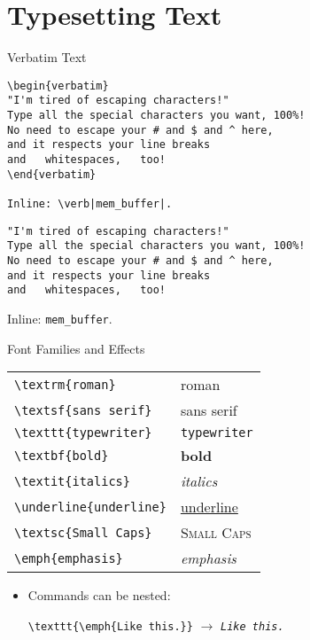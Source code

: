 \section{Typesetting Text}

\begin{frame}[fragile]{Verbatim Text}
\begin{lstlisting}[basicstyle=\ttfamily\footnotesize]
\begin{verbatim}
"I'm tired of escaping characters!"
Type all the special characters you want, 100%!
No need to escape your # and $ and ^ here,
and it respects your line breaks
and   whitespaces,   too!
\end{verbatim}

Inline: \verb|mem_buffer|.
\end{lstlisting}

\begin{center}
\small
{}
\begin{verbatim}
"I'm tired of escaping characters!"
Type all the special characters you want, 100%!
No need to escape your # and $ and ^ here,
and it respects your line breaks
and   whitespaces,   too!
\end{verbatim}

Inline: \verb|mem_buffer|.

\endminipage
\end{center}
\end{frame}

\begin{frame}[fragile]{Font Families and Effects}
  \begin{center}
    \begin{tabular}{ll}
\hline
\lstinline|\textrm{roman}| & \textrm{roman} \\
\lstinline|\textsf{sans serif}| & \textsf{sans serif} \\
\lstinline|\texttt{typewriter}| & \texttt{typewriter} \\
\hline
\lstinline|\textbf{bold}| & \textbf{bold} \\
\lstinline|\textit{italics}| & \textit{italics} \\
\lstinline|\underline{underline}| & \underline{underline} \\
\lstinline|\textsc{Small Caps}| & \textsc{Small Caps} \\
\lstinline|\emph{emphasis}| & \emph{emphasis} \\
\hline
    \end{tabular}
  \end{center}
  
\begin{itemize}
\item Commands can be nested:

\lstinline|\texttt{\emph{Like this.}}| $\rightarrow$  \texttt{\emph{Like this.}}
\end{itemize}
\end{frame}


